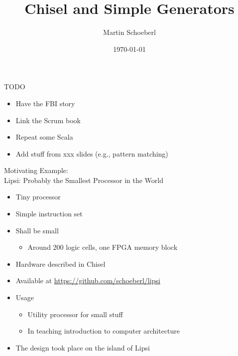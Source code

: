

\newif\ifbook


\usepackage{tikz}
\usetikzlibrary{positioning, arrows.meta}


\title{Chisel and Simple Generators}
\author{Martin Schoeberl}
\date{\today}



\begin{frame}
\titlepage
\end{frame}

\begin{frame}[fragile]{TODO}
\begin{itemize}
\item Have the FBI story
\item Link the Scrum book
\item Repeat some Scala
\item Add stuff from xxx slides (e.g., pattern matching)
\end{itemize}
\end{frame}

\begin{frame}[fragile]{Motivating Example:\\
Lipsi: Probably the Smallest Processor in the World}
\begin{itemize}
\item Tiny processor
\item Simple instruction set
\item Shall be small
\begin{itemize}
\item Around 200 logic cells, one FPGA memory block
\end{itemize}
\item Hardware described in Chisel
\item Available at \url{https://github.com/schoeberl/lipsi}
\item Usage
\begin{itemize}
\item Utility processor for small stuff
\item In teaching introduction to computer architecture
\end{itemize}
\item The design took place on the island of Lipsi
\end{itemize}
\end{frame}

